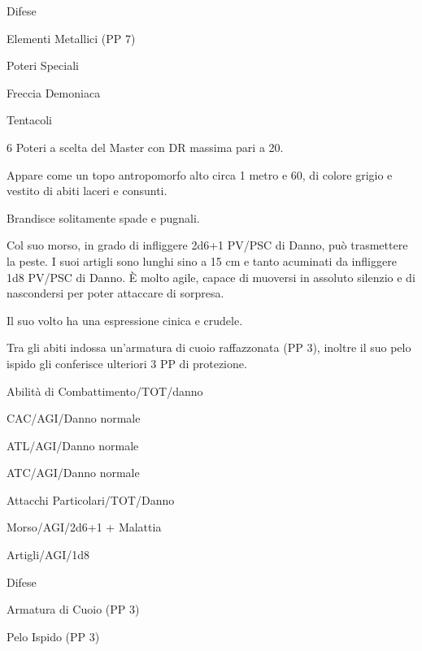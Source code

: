\begin{parmostro}{Difese} 
\item Elementi Metallici (PP 7)
\end{parmostro}

\begin{parmostro}{Poteri Speciali} 
\item Freccia Demoniaca 
\item Tentacoli 
\item 6 Poteri a scelta del Master con DR massima pari a 20.
\end{parmostro}


 Appare come un
topo antropomorfo alto circa 1 metro e 60, di colore grigio e vestito di
abiti laceri e consunti.

Brandisce solitamente spade e pugnali.

Col suo morso, in grado di infliggere 2d6+1 PV/\-PSC di Danno, pu\`o
trasmettere la peste. I suoi artigli sono lunghi sino a 15 cm e tanto
acuminati da infliggere 1d8 PV/\-PSC di Danno. \`E molto agile, capace
di muoversi in assoluto silenzio e di nascondersi per poter attaccare
di sorpresa. 

Il suo volto ha una espressione cinica e crudele.

Tra gli abiti indossa un'armatura di cuoio raffazzonata (PP 3),
inoltre il suo pelo ispido gli conferisce ulteriori 3 PP di
protezione.


\begin{parmostro}{Abilit\`a di Combattimento/TOT/danno} 
\item CAC/AGI/Danno normale
\item ATL/AGI/Danno normale
\item ATC/AGI/Danno normale
\end{parmostro}

\begin{parmostro}{Attacchi Particolari/TOT/Danno}
\item Morso/AGI/2d6+1 + Malattia
\item Artigli/AGI/1d8
\end{parmostro}

\begin{parmostro}{Difese} 
\item Armatura di Cuoio (PP 3) 
\item Pelo Ispido (PP 3)
\end{parmostro}




